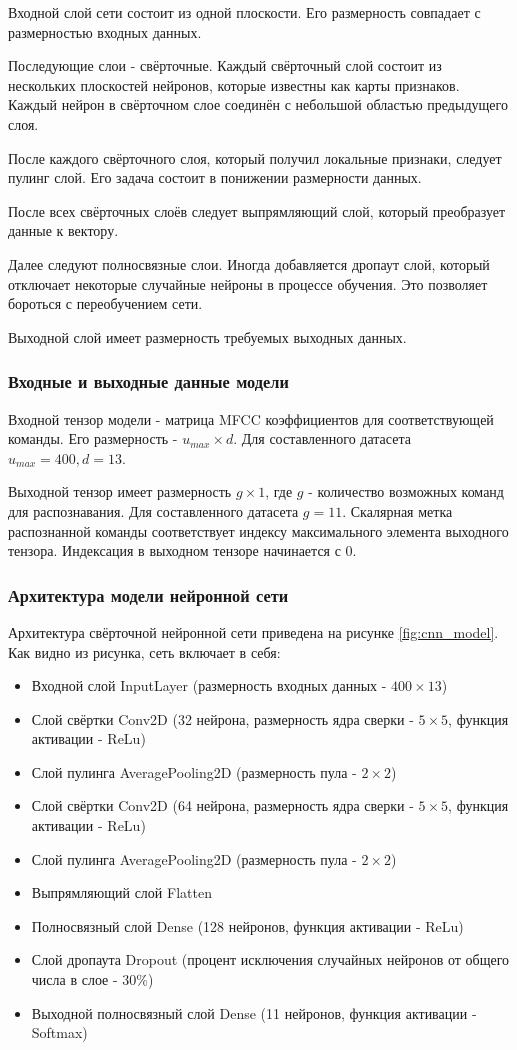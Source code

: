Входной слой сети состоит из одной плоскости. Его размерность совпадает с размерностью входных данных. 

Последующие слои - свёрточные. Каждый свёрточный слой состоит из нескольких плоскостей нейронов, которые известны как карты признаков. Каждый нейрон в свёрточном слое соединён с небольшой областью предыдущего слоя.

После каждого свёрточного слоя, который получил локальные признаки, следует пулинг слой. Его задача состоит в понижении размерности данных.

После всех свёрточных слоёв следует выпрямляющий слой, который преобразует данные к вектору. 

Далее следуют полносвязные слои. Иногда добавляется дропаут слой, который отключает некоторые случайные нейроны в процессе обучения. Это позволяет бороться с переобучением сети.

Выходной слой имеет размерность требуемых выходных данных. 

\subsubsection{Входные и выходные данные модели}
Входной тензор модели - матрица MFCC коэффициентов для соответствующей команды. Его размерность - $u_{max} \times d$. Для составленного датасета $u_{max}=400, d=13$.

Выходной тензор имеет размерность $g \times 1$, где $g$ - количество возможных команд для распознавания. Для составленного датасета $g=11$. Скалярная метка распознанной команды соответствует индексу максимального элемента выходного тензора. Индексация в выходном тензоре начинается с 0.
\subsubsection{Архитектура модели нейронной сети}
Архитектура свёрточной нейронной сети приведена на рисунке \ref{fig:cnn_model}. Как видно из рисунка, сеть включает в себя:
\begin{itemize}[leftmargin=2cm]
	\item Входной слой InputLayer (размерность входных данных - $400 \times 13$)
	\item Слой свёртки Conv2D (32 нейрона, размерность ядра сверки - $5 \times 5$, функция активации - ReLu)
	\item Слой пулинга AveragePooling2D (размерность пула - $2 \times 2$)
	\item Слой свёртки Conv2D (64 нейрона, размерность ядра сверки - $5 \times 5$, функция активации - ReLu)
	\item Слой пулинга AveragePooling2D (размерность пула - $2 \times 2$)
	\item Выпрямляющий слой Flatten
	\item Полносвязный слой Dense (128 нейронов, функция активации - ReLu)
	\item Слой дропаута Dropout (процент исключения случайных нейронов от общего числа в слое - 30\%)
	\item Выходной полносвязный слой Dense (11 нейронов, функция активации - Softmax)
\end{itemize}

